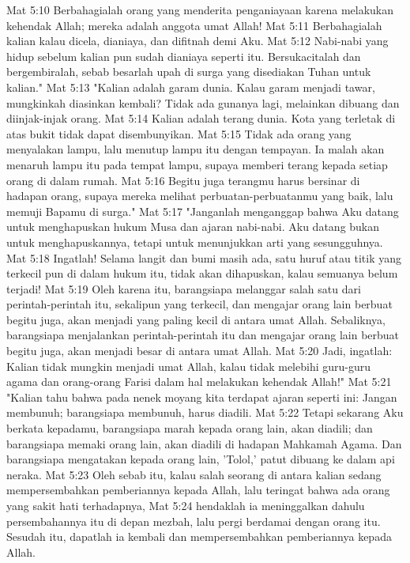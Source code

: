Mat 5:10  Berbahagialah orang yang menderita penganiayaan karena melakukan kehendak Allah; mereka adalah anggota umat Allah!
Mat 5:11  Berbahagialah kalian kalau dicela, dianiaya, dan difitnah demi Aku.
Mat 5:12  Nabi-nabi yang hidup sebelum kalian pun sudah dianiaya seperti itu. Bersukacitalah dan bergembiralah, sebab besarlah upah di surga yang disediakan Tuhan untuk kalian."
Mat 5:13  "Kalian adalah garam dunia. Kalau garam menjadi tawar, mungkinkah diasinkan kembali? Tidak ada gunanya lagi, melainkan dibuang dan diinjak-injak orang.
Mat 5:14  Kalian adalah terang dunia. Kota yang terletak di atas bukit tidak dapat disembunyikan.
Mat 5:15  Tidak ada orang yang menyalakan lampu, lalu menutup lampu itu dengan tempayan. Ia malah akan menaruh lampu itu pada tempat lampu, supaya memberi terang kepada setiap orang di dalam rumah.
Mat 5:16  Begitu juga terangmu harus bersinar di hadapan orang, supaya mereka melihat perbuatan-perbuatanmu yang baik, lalu memuji Bapamu di surga."
Mat 5:17  "Janganlah menganggap bahwa Aku datang untuk menghapuskan hukum Musa dan ajaran nabi-nabi. Aku datang bukan untuk menghapuskannya, tetapi untuk menunjukkan arti yang sesungguhnya.
Mat 5:18  Ingatlah! Selama langit dan bumi masih ada, satu huruf atau titik yang terkecil pun di dalam hukum itu, tidak akan dihapuskan, kalau semuanya belum terjadi!
Mat 5:19  Oleh karena itu, barangsiapa melanggar salah satu dari perintah-perintah itu, sekalipun yang terkecil, dan mengajar orang lain berbuat begitu juga, akan menjadi yang paling kecil di antara umat Allah. Sebaliknya, barangsiapa menjalankan perintah-perintah itu dan mengajar orang lain berbuat begitu juga, akan menjadi besar di antara umat Allah.
Mat 5:20  Jadi, ingatlah: Kalian tidak mungkin menjadi umat Allah, kalau tidak melebihi guru-guru agama dan orang-orang Farisi dalam hal melakukan kehendak Allah!"
Mat 5:21  "Kalian tahu bahwa pada nenek moyang kita terdapat ajaran seperti ini: Jangan membunuh; barangsiapa membunuh, harus diadili.
Mat 5:22  Tetapi sekarang Aku berkata kepadamu, barangsiapa marah kepada orang lain, akan diadili; dan barangsiapa memaki orang lain, akan diadili di hadapan Mahkamah Agama. Dan barangsiapa mengatakan kepada orang lain, 'Tolol,' patut dibuang ke dalam api neraka.
Mat 5:23  Oleh sebab itu, kalau salah seorang di antara kalian sedang mempersembahkan pemberiannya kepada Allah, lalu teringat bahwa ada orang yang sakit hati terhadapnya,
Mat 5:24  hendaklah ia meninggalkan dahulu persembahannya itu di depan mezbah, lalu pergi berdamai dengan orang itu. Sesudah itu, dapatlah ia kembali dan mempersembahkan pemberiannya kepada Allah.
